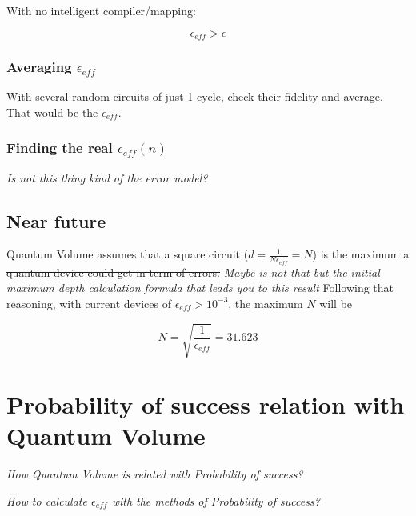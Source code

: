 \documentclass[11pt]{article}
\begin{document}
With no intelligent compiler/mapping:

$$\epsilon_{eff} > \epsilon$$

\subsubsection{Averaging \(\epsilon_{eff}\)}
\label{sec:orgf0c1810}

With several random circuits of just 1 cycle, check their fidelity and average. That would be the \(\bar{\epsilon}_{eff}\).

\subsubsection{Finding the real \(\epsilon_{eff} (n)\)}
\label{sec:org0d7e984}

\emph{Is not this thing kind of the error model?}

\subsection{Near future}
\label{sec:org089a693}

\sout{Quantum Volume assumes that a square circuit (\(d = \frac{1}{N \epsilon_{eff}} = N\)) is the maximum a quantum device could get in term of errors.}
\emph{Maybe is not that but the initial maximum depth calculation formula that leads you to this result}
Following that reasoning, with current devices of \(\epsilon_{eff} > 10^{-3}\), the maximum \(N\) will be

$$N = \sqrt{\frac{1}{\epsilon_{eff}}} = 31.623$$



\section{Probability of success relation with Quantum Volume}
\label{sec:org5472ffd}

\emph{How Quantum Volume is related with Probability of success?}

\emph{How to calculate \(\epsilon_{eff}\) with the methods of Probability of success?}
\end{document}
